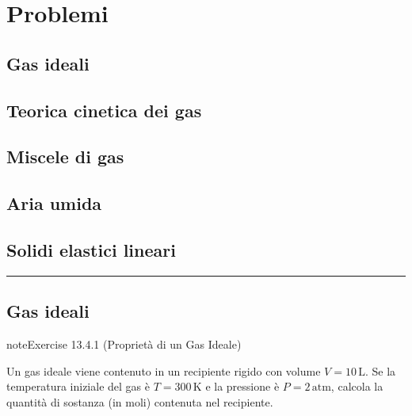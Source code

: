 \documentclass[letterpaper,10pt,italian]{jupyterBook}
\begin{document}
\sphinxstepscope


\section{Problemi}
\label{\detokenize{ch/thermodynamics/matter-problems:problemi}}\label{\detokenize{ch/thermodynamics/matter-problems:physics-hs-thermodynamics-matter-problems}}\label{\detokenize{ch/thermodynamics/matter-problems::doc}}

\subsection{Gas ideali}
\label{\detokenize{ch/thermodynamics/matter-problems:gas-ideali}}

\subsection{Teorica cinetica dei gas}
\label{\detokenize{ch/thermodynamics/matter-problems:teorica-cinetica-dei-gas}}

\subsection{Miscele di gas}
\label{\detokenize{ch/thermodynamics/matter-problems:miscele-di-gas}}

\subsection{Aria umida}
\label{\detokenize{ch/thermodynamics/matter-problems:aria-umida}}

\subsection{Solidi elastici lineari}
\label{\detokenize{ch/thermodynamics/matter-problems:solidi-elastici-lineari}}

\bigskip\hrule\bigskip



\subsection{Gas ideali}
\label{\detokenize{ch/thermodynamics/matter-problems:id1}} \label{exercise:ch/thermodynamics/matter-problems-exercise-0}

\begin{sphinxadmonition}{note}{Exercise 13.4.1 (Proprietà di un Gas Ideale)}



\sphinxAtStartPar
Un gas ideale viene contenuto in un recipiente rigido con volume \(V = 10 \, \text{L}\). Se la temperatura iniziale del gas è \(T = 300 \, \text{K}\) e la pressione è \(P = 2 \, \text{atm}\), calcola la quantità di sostanza (in moli) contenuta nel recipiente.
\end{sphinxadmonition}
 \label{exercise:ch/thermodynamics/matter-problems-exercise-1}
\end{document}
